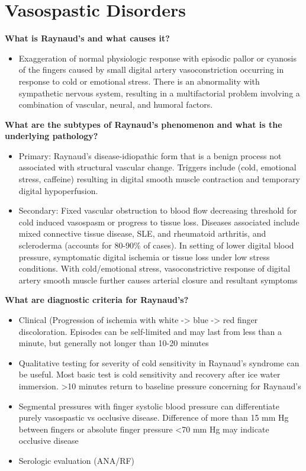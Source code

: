\documentclass[
]{book}
\providecommand{\tightlist}{%
  \setlength{\itemsep}{0pt}\setlength{\parskip}{0pt}}
\begin{document}
\hypertarget{vasospastic-disorders}{%
\section{Vasospastic Disorders}\label{vasospastic-disorders}}

\textbf{What is Raynaud's and what causes it?} \citep{shuja117UpperExtremity, landry141RaynaudPhenomenon2019}

\begin{itemize}
\tightlist
\item
  Exaggeration of normal physiologic response with episodic pallor or
  cyanosis of the fingers caused by small digital artery
  vasoconstriction occurring in response to cold or emotional stress.
  There is an abnormality with sympathetic nervous system, resulting
  in a multifactorial problem involving a combination of vascular,
  neural, and humoral factors.
\end{itemize}

\textbf{What are the subtypes of Raynaud's phenomenon and what is the
underlying pathology?}

\begin{itemize}
\item
  Primary: Raynaud's disease-idiopathic form that is a benign process
  not associated with structural vascular change. Triggers include
  (cold, emotional stress, caffeine) resulting in digital smooth
  muscle contraction and temporary digital hypoperfusion.
\item
  Secondary: Fixed vascular obstruction to blood flow decreasing
  threshold for cold induced vasospasm or progress to tissue loss.
  Diseases associated include mixed connective tissue disease, SLE,
  and rheumatoid arthritis, and scleroderma (accounts for 80-90\% of
  cases). In setting of lower digital blood pressure, symptomatic
  digital ischemia or tissue loss under low stress conditions. With
  cold/emotional stress, vasoconstrictive response of digital artery
  smooth muscle further causes arterial closure and resultant symptoms
\end{itemize}

\textbf{What are diagnostic criteria for Raynaud's?}

\begin{itemize}
\item
  Clinical (Progression of ischemia with white -\textgreater{} blue -\textgreater{} red finger
  discoloration. Episodes can be self-limited and may last from less
  than a minute, but generally not longer than 10-20 minutes~
\item
  Qualitative testing for severity of cold sensitivity in Raynaud's
  syndrome can be useful. Most basic test is cold sensitivity and
  recovery after ice water immersion. \textgreater10 minutes return to baseline
  pressure concerning for Raynaud's
\item
  Segmental pressures with finger systolic blood pressure can
  differentiate purely vasospastic vs occlusive disease. Difference of
  more than 15 mm Hg between fingers or absolute finger pressure \textless70
  mm Hg may indicate occlusive disease~
\item
  Serologic evaluation (ANA/RF)
\end{itemize}
\end{document}
